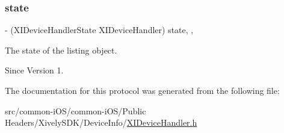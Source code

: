 \subsubsection{\texorpdfstring{state}{state}}
{\footnotesize\ttfamily -\/ (X\+I\+Device\+Handler\+State X\+I\+Device\+Handler) state\hspace{0.3cm}{\ttfamily [read]}, {\ttfamily [nonatomic]}, {\ttfamily [assign]}}



The state of the listing object. 

\begin{DoxySince}{Since}
Version 1. 
\end{DoxySince}


The documentation for this protocol was generated from the following file\+:\begin{DoxyCompactItemize}
\item 
src/common-\/i\+O\+S/common-\/i\+O\+S/\+Public Headers/\+Xively\+S\+D\+K/\+Device\+Info/\hyperlink{_x_i_device_handler_8h}{X\+I\+Device\+Handler.\+h}\end{DoxyCompactItemize}
